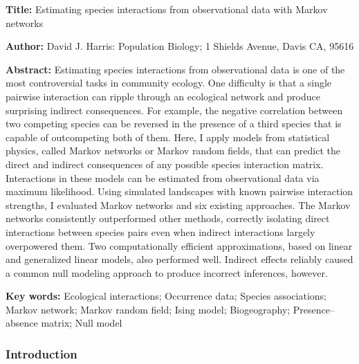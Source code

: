 \documentclass[12pt,]{article}
\date{}
\begin{document}
\begin{spacing}{1.9}
\begin{flushleft}
\renewcommand{\headrulewidth}{0pt}

\setlength{\parskip}{3pt}

\textbf{Title:} Estimating species interactions from observational data
with Markov networks

\textbf{Author:} David J. Harris: Population Biology; 1 Shields Avenue,
Davis CA, 95616

\textbf{Abstract:} Estimating species interactions from observational
data is one of the most controversial tasks in community ecology. One
difficulty is that a single pairwise interaction can ripple through an
ecological network and produce surprising indirect consequences. For
example, the negative correlation between two competing species can be
reversed in the presence of a third species that is capable of
outcompeting both of them. Here, I apply models from statistical
physics, called Markov networks or Markov random fields, that can
predict the direct and indirect consequences of any possible species
interaction matrix. Interactions in these models can be estimated from
observational data via maximum likelihood. Using simulated landscapes
with known pairwise interaction strengths, I evaluated Markov networks
and six existing approaches. The Markov networks consistently
outperformed other methods, correctly isolating direct interactions
between species pairs even when indirect interactions largely
overpowered them. Two computationally efficient approximations, based on
linear and generalized linear models, also performed well. Indirect
effects reliably caused a common null modeling approach to produce
incorrect inferences, however.

\textbf{Key words:} Ecological interactions; Occurrence data; Species
associations; Markov network; Markov random field; Ising model;
Biogeography; Presence--absence matrix; Null model

\subsubsection{Introduction}\label{introduction}

\setlength{\parindent}{1cm}


\end{flushleft}
\end{spacing}
\end{document}
